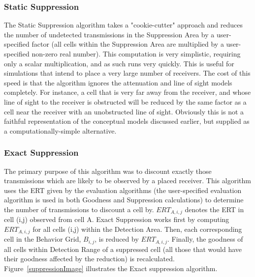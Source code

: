 \subsubsection{Static Suppression}
\label{staticSuppression}
The Static Suppression algorithm takes a "cookie-cutter" approach and reduces the number of undetected transmissions in the Suppression Area by a user-specified factor (all cells within the Suppression Area are multiplied by a user-specified non-zero real number).  This computation is very simplistic, requiring only a scalar multiplication, and as such runs very quickly.  This is useful for simulations that intend to place a very large number of receivers.  The cost of this speed is that the algorithm ignores the attenuation and line of sight models completely.  For instance, a cell that is very far away from the receiver, and whose line of sight to the receiver is obstructed will be reduced by the same factor as a cell near the receiver with an unobstructed line of sight.  Obviously this is not a faithful representation of the conceptual models discussed earlier, but supplied as a computationally-simple alternative.

\subsubsection{Exact Suppression}
\label{exactSuppression}
The primary purpose of this algorithm was to discount exactly those transmissions which are likely to be observed by a placed receiver.  This algorithm uses the ERT given by the evaluation algorithms (the user-specified evaluation algorithm is used in both Goodness and Suppression calculations) to determine the number of transmissions to discount a cell by.  $ERT_{A,i,j}$ denotes the ERT in cell (i,j) observed from cell A.  Exact Suppression works first by computing $ERT_{A,i,j}$ for all cells (i,j)  within the Detection Area.  Then, each corresponding cell in the Behavior Grid, $B_{i,j}$, is reduced by $ERT_{A,i,j}$.  Finally, the goodness of all cells within Detection Range of a suppressed cell (all those that would have their goodness affected by the reduction) is recalculated.  Figure~\ref{suppressionImage} illustrates the Exact suppression algorithm.  

